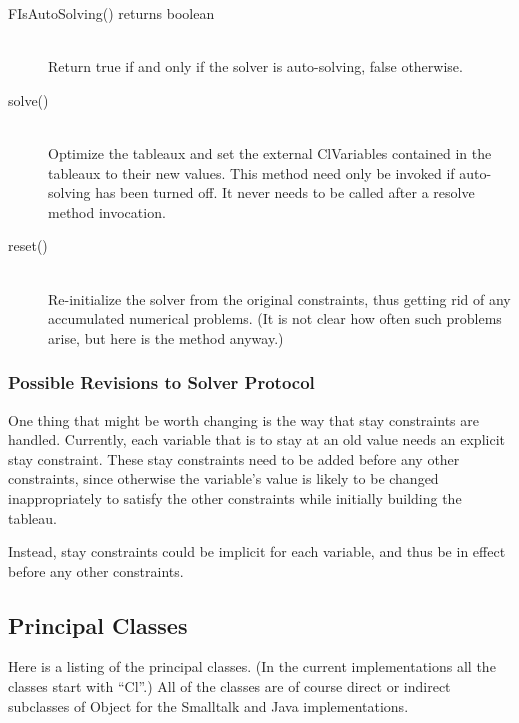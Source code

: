 \documentclass{article}
\begin{document}
\begin{description}
\item[{\sf FIsAutoSolving()} returns {\sf boolean}] \ \\
Return {\sf true} if and only if the solver is auto-solving, {\sf false} 
otherwise.

\item[{\sf solve()}] \ \\
Optimize the tableaux and set the external \textsf{ClVariable}s
contained in the tableaux to their new values.  This method need only
be invoked if auto-solving has been turned off.  It never needs to be
called after a \textsf{resolve} method invocation.

\item[{\sf reset()}] \ \\
Re-initialize the solver from the original constraints,
thus getting rid of any accumulated numerical problems.  (It is not clear
how often such problems arise, but here is the method anyway.)

\end{description}

\subsubsection{Possible Revisions to Solver Protocol}

One thing that might be worth changing is the way that stay constraints
are handled.  Currently, each variable that is to stay at an old value
needs an explicit stay constraint.  These stay constraints need to be
added before any other constraints, since otherwise the variable's value
is likely to be changed inappropriately to satisfy the other
constraints while initially building the tableau.

Instead, stay constraints could be implicit for each variable, and thus
be in effect before any other constraints.

\subsection{Principal Classes}

Here is a listing of the principal classes.  (In the current implementations
all the classes start with ``{\sf Cl}''.)  All of the classes are of course
direct or indirect subclasses of {\sf Object} for the Smalltalk and
Java implementations.
\end{document}
